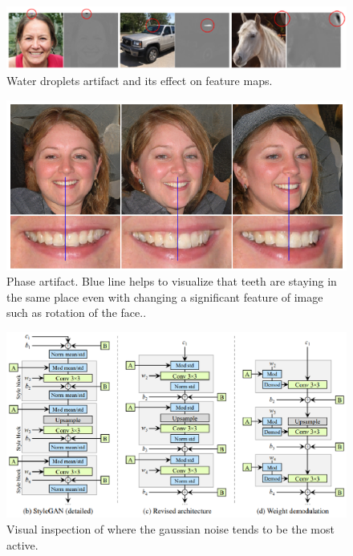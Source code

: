 \documentclass[12pt,a4paper,openany]{book}
\begin{document}
\begin{figure}[ht!]
    \centering
    \includegraphics[scale=1.0]{figs/water-droplets.eps}
    \caption{Water droplets artifact and its effect on feature maps. \cite{stylegan2}}\label{Fig:STYLEGAN}
\end{figure}


\begin{figure}[ht!]
    \centering
    \includegraphics[scale=1.2]{figs/phase.eps}
    \caption{Phase artifact. Blue line helps to visualize that teeth are staying in the same place even with changing a significant feature of image such as rotation of the face..}\label{Fig:STYLEGAN}
\end{figure}


\begin{figure}[ht!]
    \centering
    \includegraphics[scale=1.0]{figs/stylegan2-scheme2.eps}
    \caption{Visual inspection of where the gaussian noise tends to be the most active.}\label{Fig:STYLEGAN}
\end{figure}
\end{document}
